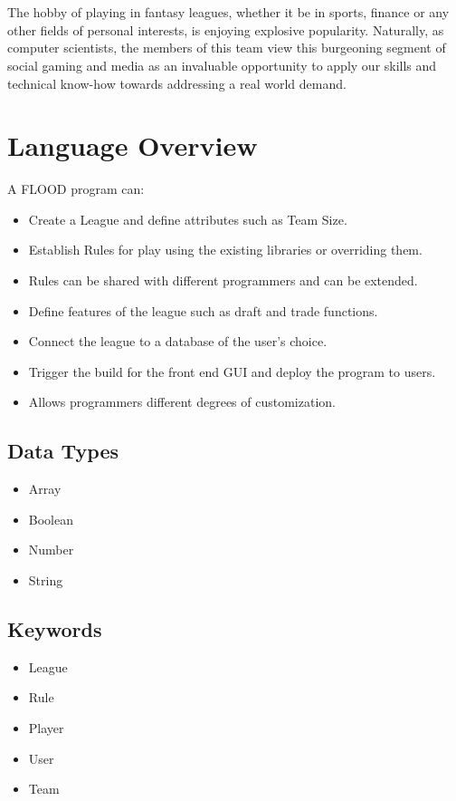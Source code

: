 \documentclass[12pt]{article}
\begin{document}
\\\\
The hobby of playing in fantasy leagues, whether it be in sports, finance or any other fields of personal interests, is enjoying explosive popularity. Naturally, as computer scientists, the members of this team view this burgeoning segment of social gaming and media as an invaluable opportunity to apply our skills and technical know-how towards addressing a real world demand.

\section{Language Overview}
A FLOOD program can:
\begin{itemize}
\setlength{\itemsep}{1pt}
\item Create a League and define attributes such as Team Size.
\item Establish Rules for play using the existing libraries or overriding them.
\item Rules can be shared with different programmers and can be extended.
\item Define features of the league such as draft and trade functions.
\item Connect the league to a database of the user's choice.
\item Trigger the build for the front end GUI and deploy the program to users.
\item Allows programmers different degrees of customization.
\end{itemize}

\subsection{Data Types}
\begin{itemize}
\setlength{\itemsep}{1pt}
\item Array
\item Boolean
\item Number
\item String
\end{itemize}

\subsection{Keywords}
\begin{itemize}
\setlength{\itemsep}{1pt}
\item League
\item Rule
\item Player
\item User
\item Team
\end{itemize}
\end{document}

